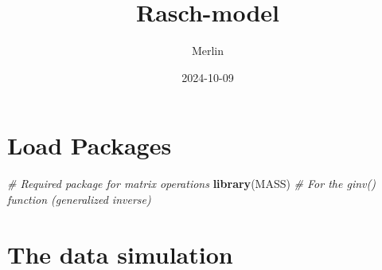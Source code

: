 \documentclass[
]{article}
\title{Rasch-model}
\author{Merlin}
\date{2024-10-09}
\newenvironment{Shaded}{\begin{snugshade}}{\end{snugshade}}
\newcommand{\CommentTok}[1]{\textcolor[rgb]{0.56,0.35,0.01}{\textit{#1}}}
\newcommand{\FunctionTok}[1]{\textcolor[rgb]{0.13,0.29,0.53}{\textbf{#1}}}
\newcommand{\NormalTok}[1]{#1}
\begin{document}
\maketitle

\section{Load Packages}\label{load-packages}

\begin{Shaded}
\begin{Highlighting}[]
\CommentTok{\# Required package for matrix operations}
\FunctionTok{library}\NormalTok{(MASS)  }\CommentTok{\# For the ginv() function (generalized inverse)}
\end{Highlighting}
\end{Shaded}

\section{The data simulation}\label{the-data-simulation}
\end{document}
